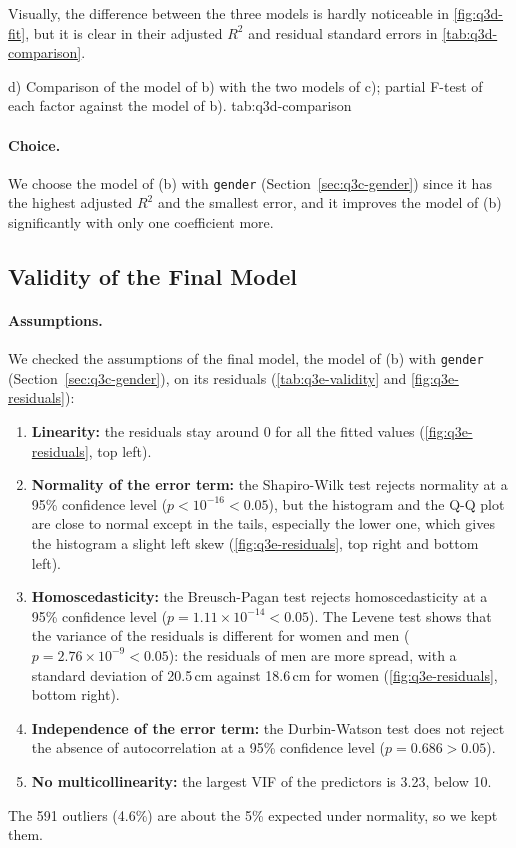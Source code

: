 Visually, the difference between the three models is hardly noticeable in \autoref{fig:q3d-fit}, but it is clear in their adjusted $R^2$ and residual standard errors in \autoref{tab:q3d-comparison}.

  {d) Comparison of the model of b) with the two models of c); partial F-test of each factor against the model of b).}
  {tab:q3d-comparison}

\paragraph{Choice.}
We choose the model of (b) with \texttt{gender} (Section~\ref{sec:q3c-gender}) since it has the highest adjusted $R^2$ and the smallest error, and it improves the model of (b) significantly with only one coefficient more.

\subsection{Validity of the Final Model}\label{sec:q3e}


\paragraph{Assumptions.}
We checked the assumptions of the final model, the model of (b) with \texttt{gender} (Section~\ref{sec:q3c-gender}), on its residuals (\autoref{tab:q3e-validity} and \autoref{fig:q3e-residuals}):
\begin{enumerate}
  \item \textbf{Linearity:} the residuals stay around 0 for all the fitted values (\autoref{fig:q3e-residuals}, top left).
  \item \textbf{Normality of the error term:} the Shapiro-Wilk test rejects normality at a 95\% confidence level ($p < 10^{-16} < 0.05$), but the histogram and the Q-Q plot are close to normal except in the tails, especially the lower one, which gives the histogram a slight left skew (\autoref{fig:q3e-residuals}, top right and bottom left).
  \item \textbf{Homoscedasticity:} the Breusch-Pagan test rejects homoscedasticity at a 95\% confidence level ($p = 1.11 \times 10^{-14} < 0.05$).
    The Levene test shows that the variance of the residuals is different for women and men ($p = 2.76 \times 10^{-9} < 0.05$): the residuals of men are more spread, with a standard deviation of 20.5\,cm against 18.6\,cm for women (\autoref{fig:q3e-residuals}, bottom right).
  \item \textbf{Independence of the error term:} the Durbin-Watson test does not reject the absence of autocorrelation at a 95\% confidence level ($p = 0.686 > 0.05$).
  \item \textbf{No multicollinearity:} the largest VIF of the predictors is 3.23, below 10.
\end{enumerate}
The 591 outliers (4.6\%) are about the 5\% expected under normality, so we kept them.

